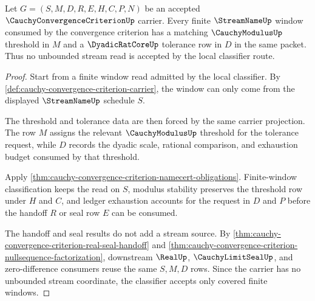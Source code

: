 \begin{theorem}
\label{thm:cauchy-convergence-criterion-window-threshold-coverage}
Let $G=(S,M,D,R,E,H,C,P,N)$ be an accepted $\CauchyConvergenceCriterionUp$ carrier. Every finite $\StreamNameUp$ window consumed by the convergence criterion has a matching $\CauchyModulusUp$ threshold in $M$ and a $\DyadicRatCoreUp$ tolerance row in $D$ in the same packet. Thus no unbounded stream read is accepted by the local classifier route.
\end{theorem}
\begin{proof}
Start from a finite window read admitted by the local classifier. By \autoref{def:cauchy-convergence-criterion-carrier}, the window can only come from the displayed $\StreamNameUp$ schedule $S$.

The threshold and tolerance data are then forced by the same carrier projection. The row $M$ assigns the relevant $\CauchyModulusUp$ threshold for the tolerance request, while $D$ records the dyadic scale, rational comparison, and exhaustion budget consumed by that threshold.

Apply \autoref{thm:cauchy-convergence-criterion-namecert-obligations}. Finite-window classification keeps the read on $S$, modulus stability preserves the threshold row under $H$ and $C$, and ledger exhaustion accounts for the request in $D$ and $P$ before the handoff $R$ or seal row $E$ can be consumed.

The handoff and seal results do not add a stream source. By \autoref{thm:cauchy-convergence-criterion-real-seal-handoff} and \autoref{thm:cauchy-convergence-criterion-nullsequence-factorization}, downstream $\RealUp$, $\CauchyLimitSealUp$, and zero-difference consumers reuse the same $S,M,D$ rows. Since the carrier has no unbounded stream coordinate, the classifier accepts only covered finite windows.
\end{proof}

